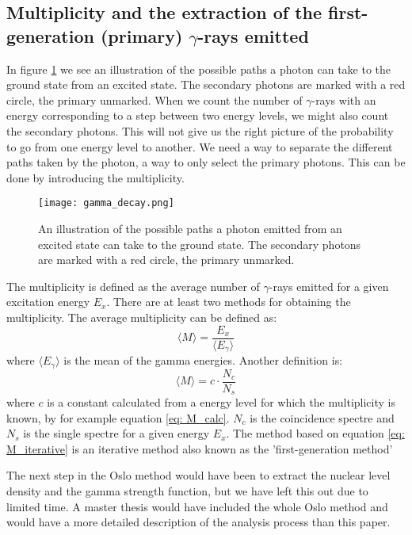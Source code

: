 \documentclass[11pt,a4wide]{article}
\begin{document}
\subsection{Multiplicity and the extraction of the first-generation (primary) $\gamma$-rays emitted}
In figure \ref{fig: gamma_decay} we see an illustration of the possible paths a photon can take to the ground state from an excited state. The secondary photons are marked with a red circle, the primary unmarked. When we count the number of $\gamma$-rays with an energy corresponding to a step between two energy levels, we might also count the secondary photons. This will not give us the right picture of the probability to go from one energy level to another. We need a way to separate the different paths taken by the photon, a way to only select the primary photons. This can be done by introducing the multiplicity. 

\begin{figure}[htp]
\centering
\texttt{[image: gamma\_decay.png]}
\caption{An illustration of the possible paths a photon emitted from an excited state can take to the ground state. The secondary photons are marked with a red circle, the primary unmarked.}
\label{fig: gamma_decay}
\end{figure}

The multiplicity is defined as the average number of $\gamma$-rays emitted for a given excitation energy $E_x$. There are at least two methods for obtaining the multiplicity. The average multiplicity can be defined as:
\begin{equation}
\langle M \rangle = \frac{E_x}{\langle E_\gamma \rangle}
\label{eq: M_calc}
\end{equation}
where $\langle E_\gamma \rangle$ is the mean of the gamma energies. Another definition is:
\begin{equation}
\langle M \rangle = c \cdot \frac{N_c}{N_s}
\label{eq: M_iterative}
\end{equation}
where $c$ is a constant calculated from a energy level for which the multiplicity is known, by for example equation \ref{eq: M_calc}. $N_c$ is the coincidence spectre and $N_s$ is the single spectre for a given energy $E_x$. The method based on equation \ref{eq: M_iterative} is an iterative method also known as the 'first-generation method'

The next step in the Oslo method would have been to extract the nuclear level density and the gamma strength function, but we have left this out due to limited time. A master thesis would have included the whole Oslo method and would have a more detailed description of the analysis process than this paper. 
\end{document}
